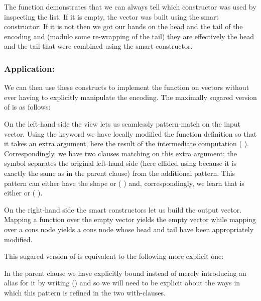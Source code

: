 The function  demonstrates that we can always tell which
constructor was used by inspecting the  list. If it
is empty, the vector was built using the  smart constructor.
If it is not then we got our hands on the head and the tail of the encoding
and (modulo some re-wrapping of the tail) they are effectively the head and the
tail that were combined using the smart constructor.

\subsubsection{Application: }

We can then use these constructs to implement the function 
on vectors without ever having to explicitly manipulate the encoding.
%
The maximally sugared version of  is as follows:


On the left-hand side the view lets us seamlessly pattern-match on the input
vector.
%
Using the  keyword we have locally modified the function
definition so that it takes an extra argument, here the result of the intermediate
computation ( ).
%
Correspondingly, we have two clauses matching on this extra argument;
the symbol \IdrisKeyword{|} separates the original left-hand side
(here ellided using \IdrisKeyword{\KatlaUnderscore{}} because it is exactly the
same as in the parent clause) from the additional pattern.
%
This pattern can
either have the shape \IdrisData{[]} or ( \IdrisData{::} )
and, correspondingly, we learn that  is either \IdrisFunction{[]} or
( \IdrisFunction{::} ).

On the right-hand side the smart constructors let us build the output vector.
Mapping a function over the empty vector yields the empty vector while mapping
over a cons node yields a cons node whose head and tail have been appropriately
modified.


This sugared version of  is equivalent to the following more
explicit one:


In the parent clause we have explicitly bound 
instead of merely introducing an alias for it by writing
{(\IdrisKeyword{\_})}
and so we will need to be explicit about the ways in which this
pattern is refined in the two with-clauses.

